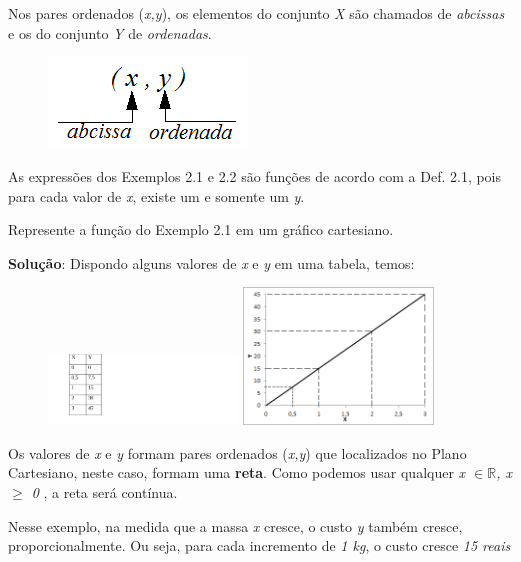 Nos pares ordenados (\textit{x,y}), os elementos do conjunto \textit{X} são chamados de \textit{abcissas} e os do conjunto \textit{Y} de \textit{ordenadas}.

\begin{figure}[H]
	\begin{Center}
		\includegraphics[width=2.08in,height=0.95in]{capitulos/funcao_do_primeiro_grau/media/image2.png}
	\end{Center}
\end{figure}

As expressões dos Exemplos 2.1 e 2.2 são funções de acordo com a Def. 2.1, pois para cada valor de \textit{x}, existe um e somente um \textit{y}. 

\begin{texemplo}
Represente a função do Exemplo 2.1 em um gráfico cartesiano.

\textbf{Solução}: Dispondo alguns valores de \textit{x} e \textit{y} em uma tabela, temos: 

\begin{figure}[H]
    \includegraphics[width=0.45\textwidth]{capitulos/funcao_do_primeiro_grau/media/image3.pdf} 
    \includegraphics[width=0.45\textwidth]{capitulos/funcao_do_primeiro_grau/media/image4.png}
\end{figure}

Os valores de \textit{x} e \textit{y} formam pares ordenados (\textit{x,y}) que localizados no Plano Cartesiano, neste caso, formam uma \textbf{reta}. Como podemos usar qualquer \textit{x $ \in \mathbb{R} $, x $ \geq $  0} , a reta será contínua.

Nesse exemplo, na medida que a massa \textit{x} cresce, o custo \textit{y} também cresce, proporcionalmente. Ou seja, para cada incremento de \textit{1 kg}, o custo cresce \textit{15 reais} \qedsymbol{}
\end{texemplo}

